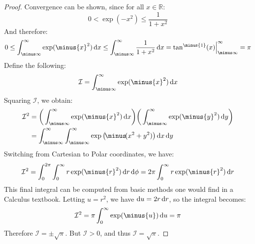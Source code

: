    \begin{proof}
        Convergence can be shown, since for
        all $x\in\mathbb{R}$:
        \begin{equation}
            0<\exp(\minus{x}^{2})
            \leq\frac{1}{1+x^2}
        \end{equation}
        And therefore:
        \begin{equation}
            0\leq\int_{\minus\infty}^{\infty}
            \exp(\minus{x}^{2})\diff{x}\leq
            \int_{\minus\infty}^{\infty}
            \frac{1}{1+x^2}\diff{x}
            =\tan^{\minus{1}}(x)
            \Big|_{\minus\infty}^{\infty}=\pi
        \end{equation}
        Define the following:
        \begin{equation}
            \mathcal{I}=\int_{\minus\infty}^{\infty}
            \exp(\minus{x}^{2})\diff{x}
        \end{equation}
        Squaring $\mathcal{I}$, we obtain:
        \begin{subequations}
            \begin{align}
                \mathcal{I}^{2}&=
                \bigg(\int_{\minus\infty}^{\infty}
                \exp(\minus{x}^{2})\diff{x}\bigg)
                \bigg(\int_{\minus\infty}^{\infty}
                \exp(\minus{y}^{2})\diff{y}\bigg)\\
                &=\int_{\minus\infty}^{\infty}
                \int_{\minus\infty}^{\infty}
                \exp\big(\!\minus\!(x^{2}+y^{2})\big)
                    \diff{x}\diff{y}
            \end{align}
        \end{subequations}
        Switching from Cartesian to
        Polar coordinates, we have:
        \begin{equation}
            \mathcal{I}^{2}=
            \int_{0}^{2\pi}\int_{0}^{\infty}
            r\exp(\minus{r}^{2})\diff{r}\diff{\phi}
            =2\pi\int_{0}^{\infty}
            r\exp(\minus{r}^{2})\diff{r}
        \end{equation}
        This final integral can be computed from basic
        methods one would find in a Calculus textbook.
        Letting $u=r^{2}$, we have
        $\mathop{}\!\mathrm{d}{u}=2r\mathop{}\!\mathrm{d}{r}$,
        so the integral becomes:
        \begin{equation}
            \mathcal{I}^{2}=\pi\int_{0}^{\infty}
                \exp(\minus{u})\diff{u}
            =\pi
        \end{equation}
        Therefore $\mathcal{I}=\pm\sqrt{\pi}$.
        But $\mathcal{I}>0$, and thus
        $\mathcal{I}=\sqrt{\pi}$.
    \end{proof}
